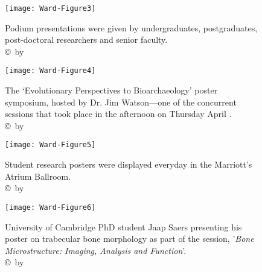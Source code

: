 \documentclass[english]{ijsra}
\begin{document}
\begin{figure}[!htb] %
		\centering
		\texttt{[image: Ward-Figure3]}
		\caption{Podium presentations were given by undergraduates, postgraduates, post-doctoral researchers and senior faculty. 
		{\normalfont\scriptsize \\ \copyright\ by \shortauthor}}
		\label{fig:Ward-Figure3}
	\end{figure}
	
	\begin{figure}[!htb] %
		\centering
		\texttt{[image: Ward-Figure4]}
		\caption{The ‘Evolutionary Perspectives to Bioarchaeology’ poster symposium, hosted by Dr. Jim Watson—one of the concurrent sessions that took place in the afternoon on Thursday April . 
		{\normalfont\scriptsize \\ \copyright\ by \shortauthor}}
		\label{fig:Ward-Figure4}
	\end{figure}
	
	\begin{figure}[!htb] %
		\texttt{[image: Ward-Figure5]}
		\caption{Student research posters were displayed everyday in the Marriott's Atrium Ballroom. 
		{\normalfont\scriptsize \\ \copyright\ by \shortauthor}}
		\label{fig:Ward-Figure5}
	\end{figure}
	
	\begin{figure}[!htb] %
		\texttt{[image: Ward-Figure6]}
		\caption{University of Cambridge PhD student Jaap Saers presenting his poster on trabecular bone morphology as part of the session, '\emph{Bone Microstructure: Imaging, Analysis and Function}'.
				{\normalfont\scriptsize \\ \copyright\ by \shortauthor}}
		\label{fig:Ward-Figure6}
	\end{figure}
\end{document}

